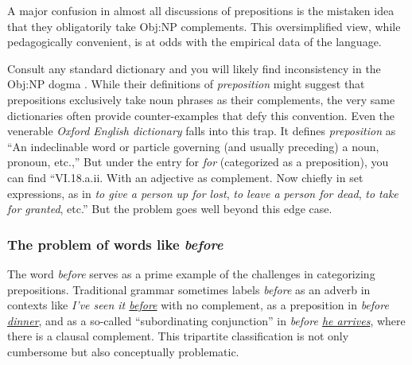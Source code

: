 A major confusion in almost all discussions of prepositions is the mistaken idea that they obligatorily take Obj:NP complements. This oversimplified view, while pedagogically convenient, is at odds with the empirical data of the language.

Consult any standard dictionary and you will likely find inconsistency in the Obj:NP dogma \autocite{reynolds2025}. While their definitions of \textit{preposition} might suggest that prepositions exclusively take noun phrases as their complements, the very same dictionaries often provide counter-examples that defy this convention. Even the venerable \textit{Oxford English dictionary} falls into this trap. It defines \textit{preposition} as ``An indeclinable word or particle governing (and usually preceding) a noun, pronoun, etc.,'' But under the entry for \textit{for} (categorized as a preposition), you can find ``VI.18.a.ii. With an adjective as complement. Now chiefly in set expressions, as in \textit{to give a person up for lost}, \textit{to leave a person for dead}, \textit{to take for granted}, etc.'' But the problem goes well beyond this edge case.

\subsubsection*{The problem of words like \textit{before}} \label{sec:likebefore}

The word \textit{before} serves as a prime example of the challenges in categorizing prepositions. Traditional grammar sometimes labels \textit{before} as an adverb in contexts like \textit{I've seen it \uline{before}} with no complement, as a preposition in \textit{before \uline{dinner}}, and as a so-called ``subordinating conjunction'' in \textit{before \uline{he arrives}}, where there is a clausal complement. This tripartite classification is not only cumbersome but also conceptually problematic.

